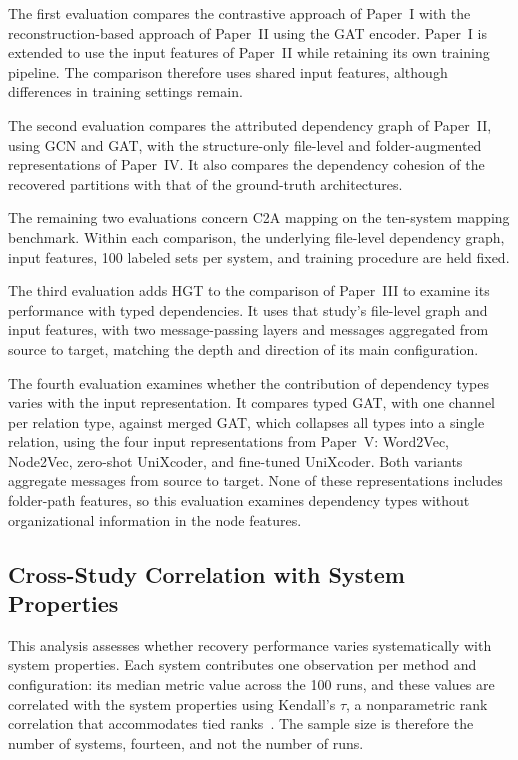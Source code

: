 The first evaluation compares the contrastive approach of Paper~I with the reconstruction-based approach of Paper~II using the GAT encoder. Paper~I is extended to use the input features of Paper~II while retaining its own training pipeline. The comparison therefore uses shared input features, although differences in training settings remain.
 
The second evaluation compares the attributed dependency graph of Paper~II, using GCN and GAT, with the structure-only file-level and folder-augmented representations of Paper~IV. It also compares the dependency cohesion of the recovered partitions with that of the ground-truth architectures.
 
The remaining two evaluations concern C2A mapping on the ten-system mapping benchmark. Within each comparison, the underlying file-level dependency graph, input features, 100 labeled sets per system, and training procedure are held fixed.
 
The third evaluation adds HGT to the comparison of Paper~III to examine its performance with typed dependencies. It uses that study's file-level graph and input features, with two message-passing layers and messages aggregated from source to target, matching the depth and direction of its main configuration.
 
The fourth evaluation examines whether the contribution of dependency types varies with the input representation. It compares typed GAT, with one channel per relation type, against merged GAT, which collapses all types into a single relation, using the four input representations from Paper~V: Word2Vec, Node2Vec, zero-shot UniXcoder, and fine-tuned UniXcoder. Both variants aggregate messages from source to target. None of these representations includes folder-path features, so this evaluation examines dependency types without organizational information in the node features.

\subsection{Cross-Study Correlation with System Properties \label{sec:sytem_properties_corr}}
This analysis assesses whether recovery performance varies systematically with system properties. Each system contributes one observation per method and configuration: its median metric value across the 100 runs, and these values are correlated with the system properties using Kendall's $\tau$, a nonparametric rank correlation that accommodates tied ranks~\cite{kendall}. The sample size is therefore the number of systems, fourteen, and not the number of runs.
 
